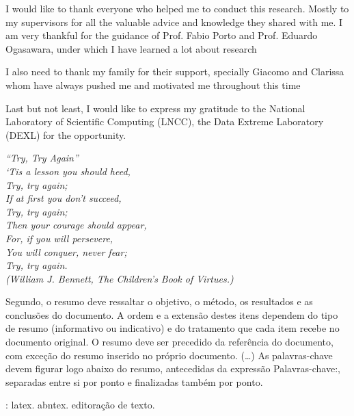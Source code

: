 \documentclass[
	final,				%
	12pt,				%
	openright,			%
	oneside,			%
	a4paper,			%
	hyphens,            %
	sumario=tradicional,%
	english,			%
	french,				%
	spanish,			%
	brazil				%
	]{abntex2}
\begin{document}
\begin{agradecimentos}
I would like to thank everyone who helped me to conduct this research. Mostly to my supervisors for all the valuable advice and knowledge they shared with me. I am very thankful for the guidance of Prof. Fabio Porto and Prof. Eduardo Ogasawara, under which I have learned a lot about research

I also need to thank my family for their support, specially Giacomo and Clarissa whom have always pushed me and motivated me throughout this time

Last but not least, I would like to express my gratitude to the National Laboratory of Scientific Computing (LNCC), the Data Extreme Laboratory (DEXL) for the opportunity.  

\end{agradecimentos}

\begin{epigrafe}
    \vspace*{\fill}
	\begin{flushright}
		\textit{``Try, Try Again''\\
		`Tis a lesson you should heed, \\
		Try, try again;\\
		If at first you don't succeed,\\
		Try, try again;\\
		Then your courage should appear, \\
		For, if you will persevere, \\
		You will conquer, never fear;\\
		Try, try again.\\
		(William J. Bennett, The Children's Book of Virtues.)}
	\end{flushright}
\end{epigrafe}


\setlength{\absparsep}{18pt} %
\begin{resumo}
 Segundo, o resumo deve ressaltar o
 objetivo, o método, os resultados e as conclusões do documento. A ordem e a extensão
 destes itens dependem do tipo de resumo (informativo ou indicativo) e do
 tratamento que cada item recebe no documento original. O resumo deve ser
 precedido da referência do documento, com exceção do resumo inserido no
 próprio documento. (\ldots) As palavras-chave devem figurar logo abaixo do
 resumo, antecedidas da expressão Palavras-chave:, separadas entre si por
 ponto e finalizadas também por ponto.

 \textbf{\palavrasChave}: latex. abntex. editoração de texto.
\end{resumo}
\end{document}
